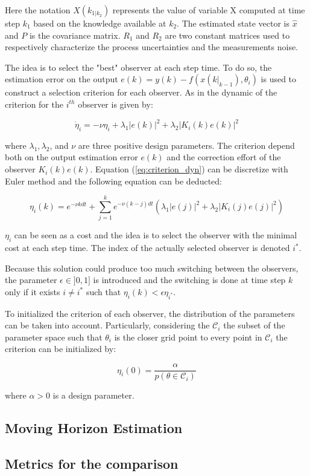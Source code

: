 Here the notation $X(k_{1|k_2})$ represents the value of variable X computed at time step $k_1$ based on the knowledge available at $k_2$. The estimated state vector is $\hat{x}$ and $P$ is the covariance matrix. $R_1$ and $R_2$ are two constant matrices used to respectively characterize the process uncertainties and the measurements noise.
\medskip


The idea is to select the "best" observer at each step time. To do so, the estimation error on the output $e(k) = y(k) - f(x(k|_{k-1}), \theta_i)$ is used to construct a selection criterion for each observer. As in \cite{petriImprovingEstimationPerformance2022} the dynamic of the criterion for the $i^{th}$ observer is given by:

\begin{equation}
\dot{\eta}_i = - \nu \eta_i + \lambda_1 |e(k)|^2 + \lambda_2 |K_i(k) e(k)|^2
\label{eq:criterion_dyn}
\end{equation}

where $\lambda_1, \lambda_2$, and $\nu$ are three positive design parameters. The criterion depend both on the output estimation error $e(k)$ and the correction effort of the observer $K_i(k) e(k)$. Equation (\ref{eq:criterion_dyn}) can be discretize with Euler method and the following equation can be deducted:

\begin{equation}
\eta_i(k) = e^{-\nu k dt} + \sum_{j=1}^{k} e^{-\nu(k-j)dt} (\lambda_1 |e(j)|^2 + \lambda_2 |K_i(j) e(j)|^2 )
\end{equation} 

$\eta_i$ can be seen as a cost and the idea is to select the observer with the minimal cost at each step time. The index of the actually selected observer is denoted $i^*$.

\medskip
Because this solution could produce too much switching between the observers, the parameter $\epsilon \in ]0,1]$ is introduced and the switching is done at time step $k$ only if it exists $i\neq i^*$ such that $\eta_i(k)<\epsilon \eta_{i^*}$.
\medskip

To initialized the criterion of each observer, the distribution of the parameters can be taken into account. Particularly, considering the $\mathcal{C}_i$ the subset of the parameter space such that $\theta_i$ is the closer grid point to every point in $\mathcal{C}_i$ the criterion can be initialized by:

\begin{equation}
\eta_i(0) = \frac{\alpha}{p(\theta \in \mathcal{C}_i)}
\end{equation}

where $\alpha >0$ is a design parameter.



\subsection{Moving Horizon Estimation}

\subsection{Metrics for the comparison}